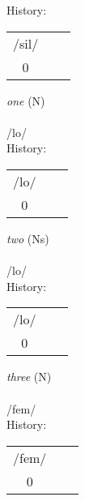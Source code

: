 \noindent History:
\begin{tabular}{ccc}
/sil/\\
0\\
\end{tabular}

\vspace{20pt}\hline



\vspace{30pt}
 \textit{ one} (N)\\
\\
\noindent /l{\textprimstress}o/\\


\noindent History:
\begin{tabular}{ccc}
/lo/\\
0\\
\end{tabular}

\vspace{20pt}\hline



\vspace{30pt}
 \textit{ two} (Ns)\\
\\
\noindent /l{\textprimstress}o/\\


\noindent History:
\begin{tabular}{ccc}
/lo/\\
0\\
\end{tabular}

\vspace{20pt}\hline



\vspace{30pt}
 \textit{ three} (N)\\
\\
\noindent /f{\textprimstress}em/\\


\noindent History:
\begin{tabular}{ccc}
/fem/\\
0\\
\end{tabular}

